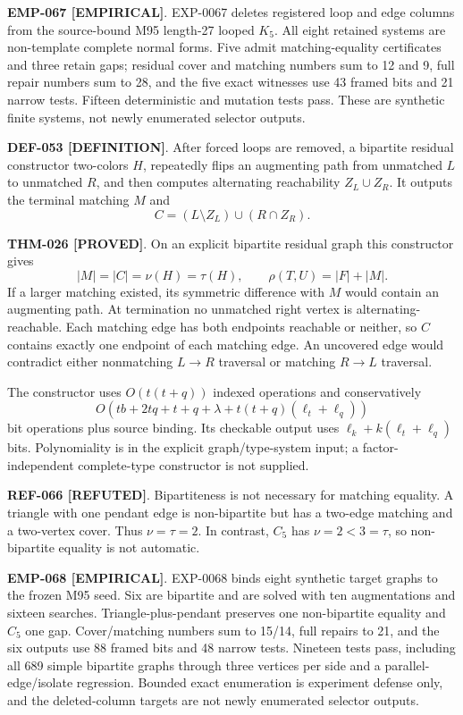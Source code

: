 \documentclass[11pt]{article}
\newcommand{\claimstatus}[2]{\textbf{#1 [#2]}}
\begin{document}
\claimstatus{EMP-067}{EMPIRICAL}. EXP-0067 deletes registered loop and edge
columns from the source-bound M95 length-27 looped \(K_5\). All eight
retained systems are non-template complete normal forms. Five admit
matching-equality certificates and three retain gaps; residual cover and
matching numbers sum to 12 and 9, full repair numbers sum to 28, and the five
exact witnesses use 43 framed bits and 21 narrow tests. Fifteen deterministic
and mutation tests pass. These are synthetic finite systems, not newly
enumerated selector outputs.

\claimstatus{DEF-053}{DEFINITION}. After forced loops are removed, a
bipartite residual constructor two-colors \(H\), repeatedly flips an
augmenting path from unmatched \(L\) to unmatched \(R\), and then computes
alternating reachability \(Z_L\cup Z_R\). It outputs the terminal matching
\(M\) and
\[
 C=(L\setminus Z_L)\cup(R\cap Z_R).
\]

\claimstatus{THM-026}{PROVED}. On an explicit bipartite residual graph this
constructor gives
\[
 |M|=|C|=\nu(H)=\tau(H),\qquad
 \rho(T,U)=|F|+|M|.
\]
If a larger matching existed, its symmetric difference with \(M\) would
contain an augmenting path. At termination no unmatched right vertex is
alternating-reachable. Each matching edge has both endpoints reachable or
neither, so \(C\) contains exactly one endpoint of each matching edge. An
uncovered edge would contradict either nonmatching \(L\to R\) traversal or
matching \(R\to L\) traversal.

The constructor uses \(O(t(t+q))\) indexed operations and conservatively
\[
 O(tb+2tq+t+q+\lambda+t(t+q)(\ell_t+\ell_q))
\]
bit operations plus source binding. Its checkable output uses
\(\ell_k+k(\ell_t+\ell_q)\) bits. Polynomiality is in the explicit
graph/type-system input; a factor-independent complete-type constructor is
not supplied.

\claimstatus{REF-066}{REFUTED}. Bipartiteness is not necessary for matching
equality. A triangle with one pendant edge is non-bipartite but has a
two-edge matching and a two-vertex cover. Thus \(\nu=\tau=2\). In contrast,
\(C_5\) has \(\nu=2<3=\tau\), so non-bipartite equality is not automatic.

\claimstatus{EMP-068}{EMPIRICAL}. EXP-0068 binds eight synthetic target
graphs to the frozen M95 seed. Six are bipartite and are solved with ten
augmentations and sixteen searches. Triangle-plus-pendant preserves one
non-bipartite equality and \(C_5\) one gap. Cover/matching numbers sum to
15/14, full repairs to 21, and the six outputs use 88 framed bits and 48
narrow tests. Nineteen tests pass, including all 689 simple bipartite graphs
through three vertices per side and a parallel-edge/isolate regression.
Bounded exact enumeration is experiment defense only, and the deleted-column
targets are not newly enumerated selector outputs.
\end{document}
